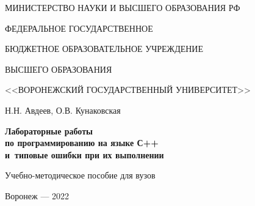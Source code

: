 

\thispagestyle{empty}
{
\large



\begin{center}

МИНИСТЕРСТВО НАУКИ И ВЫСШЕГО ОБРАЗОВАНИЯ РФ

\vspace{3mm}

ФЕДЕРАЛЬНОЕ ГОСУДАРСТВЕННОЕ
\vspace{3mm}

БЮДЖЕТНОЕ ОБРАЗОВАТЕЛЬНОЕ УЧРЕЖДЕНИЕ
\vspace{3mm}

ВЫСШЕГО ОБРАЗОВАНИЯ
\vspace{3mm}



<<ВОРОНЕЖСКИЙ ГОСУДАРСТВЕННЫЙ УНИВЕРСИТЕТ>>
\vspace{30mm}

 { \Large Н.Н. Авдеев, О.В. Кунаковская}
\vspace{30mm}

{\Huge \bf
	Лабораторные работы
	\\\vspace{5mm}
	по программированию на языке С++
	\\\vspace{5mm}
	и~типовые ошибки при их выполнении


}

\vspace{30mm}

            {\Large   Учебно-методическое пособие для вузов }

\end{center}

\vspace{55mm}





\begin{center}









{\Large Воронеж --- 2022}

\end{center}
}
\newpage
